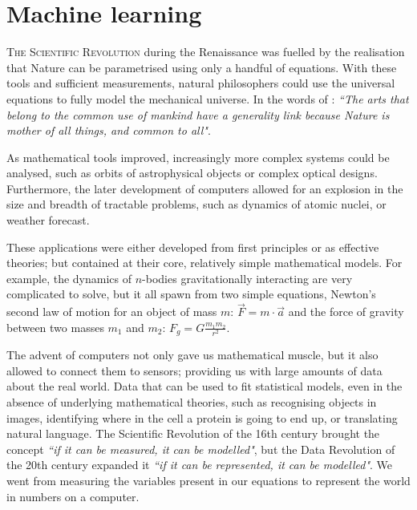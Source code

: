 \chapter{Machine learning}
\lettrine[lines=3, lhang=0.2, nindent=0em]{\color{Maroon}T}{he Scientific Revolution}
during the Renaissance 
was fuelled by the realisation that Nature can be parametrised using only a handful of equations.
With these tools and sufficient measurements, natural philosophers could use the universal equations to fully model the mechanical universe.
In the words of \citet{carranza}: \emph{{``The arts that belong to the common use of mankind have a generality link because Nature is mother of all things, and common to all"}}.

As mathematical tools improved, increasingly more complex systems could be analysed, such as orbits of astrophysical objects or complex optical designs.
Furthermore, the later development of computers allowed for an explosion in the size and breadth of tractable problems, such as dynamics of atomic nuclei, or weather forecast.

These applications were either developed from first principles or as effective theories; but contained at their core, relatively simple mathematical models.
For example, the dynamics of $n$-bodies gravitationally interacting are very complicated to solve, but it all spawn from two simple equations, Newton's second law of motion for an object of mass $m$: $\vec{F} = m \cdot \vec{a}$ and the force of gravity between two masses $m_1$ and $m_2$: $F_g=G\frac{m_1  m_2}{r^2}$.

The advent of computers not only gave us mathematical muscle, but it also allowed to connect them to sensors;
providing us with large amounts of data about the real world.
Data that can be used to fit statistical models, even in the absence of underlying mathematical theories, such as recognising objects in images, identifying where in the cell a protein is going to end up, or translating natural language.
The Scientific Revolution of the 16th century brought the concept \emph{``if it can be measured, it can be modelled"}, but the Data Revolution of the 20th century expanded it \emph{``if it can be \emph{represented}, it can be modelled"}.
We went from measuring the variables present in our equations to represent the world in numbers on a computer.

